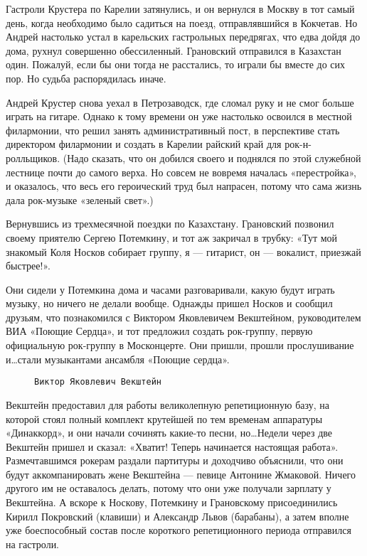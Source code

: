 Гастроли Крустера по Карелии затянулись, и он вернулся в Москву в тот самый день, когда необходимо было садиться на
поезд, отправлявшийся в Кокчетав. Но Андрей настолько устал в карельских гастрольных передрягах, что едва дойдя до дома,
рухнул совершенно обессиленный. Грановский отправился в Казахстан один. Пожалуй, если бы они тогда не расстались, то
играли бы вместе до сих пор. Но судьба распорядилась иначе.

Андрей Крустер снова уехал в Петрозаводск, где сломал руку и не смог больше играть на гитаре. Однако к тому времени он
уже настолько освоился в местной филармонии, что решил занять административный пост, в перспективе стать директором
филармонии и создать в Карелии райский край для рок-н-ролльщиков. (Надо сказать, что он добился своего и поднялся по
этой служебной лестнице почти до самого верха. Но совсем не вовремя началась «перестройка», и оказалось, что весь его
героический труд был напрасен, потому что сама жизнь дала рок-музыке «зеленый свет».)

Вернувшись из трехмесячной поездки по Казахстану. Грановский позвонил своему приятелю Сергею Потемкину, и тот аж
закричал в трубку: «Тут мой знакомый Коля Носков собирает группу, я — гитарист, он — вокалист, приезжай быстрее!».

Они сидели у Потемкина дома и часами разговаривали, какую будут играть музыку, но ничего не делали вообще. Однажды
пришел Носков и сообщил друзьям, что познакомился с Виктором Яковлевичем Векштейном, руководителем ВИА «Поющие Сердца»,
и тот предложил создать рок-группу, первую официальную рок-группу в Москонцерте. Они пришли, прошли прослушивание
и\ldots стали музыкантами ансамбля «Поющие сердца».

\begin{figure}[h]
    \centering
    \caption{\texttt{Виктор Яковлевич Векштейн}}
\end{figure}

Векштейн предоставил для работы великолепную репетиционную базу, на которой стоял полный комплект крутейшей по тем
временам аппаратуры «Динаккорд», и они начали сочинять какие-то песни, но\ldots Недели через две Векштейн пришел и
сказал: «Хватит! Теперь начинается настоящая работа». Размечтавшимся рокерам раздали партитуры и доходчиво объяснили,
что они будут аккомпанировать жене Векштейна — певице Антонине Жмаковой. Ничего другого им не оставалось делать, потому
что они уже получали зарплату у Векштейна. А вскоре к Носкову, Потемкину и Грановскому присоединились Кирилл Покровский
(клавиши) и Александр Львов (барабаны), а затем вполне уже боеспособный состав после короткого репетиционного периода
отправился на гастроли.

